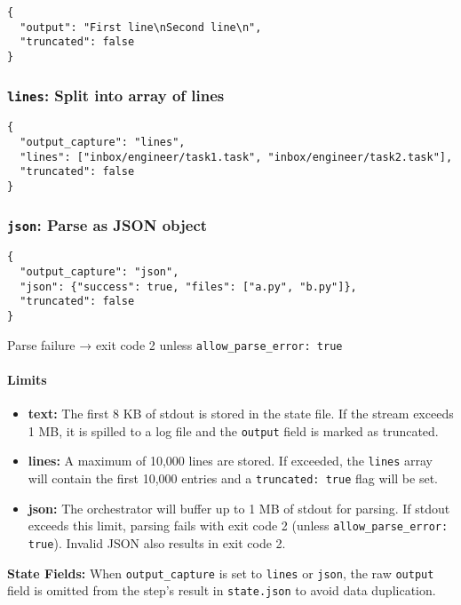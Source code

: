 \documentclass[11pt,a4paper]{article}
\begin{document}
\begin{lstlisting}[caption={Text Output Capture}]
{
  "output": "First line\nSecond line\n",
  "truncated": false
}
\end{lstlisting}

\subsubsection{\texttt{lines}: Split into array of lines}

\begin{lstlisting}[caption={Lines Output Capture}]
{
  "output_capture": "lines",
  "lines": ["inbox/engineer/task1.task", "inbox/engineer/task2.task"],
  "truncated": false
}
\end{lstlisting}

\subsubsection{\texttt{json}: Parse as JSON object}

\begin{lstlisting}[caption={JSON Output Capture}]
{
  "output_capture": "json",
  "json": {"success": true, "files": ["a.py", "b.py"]},
  "truncated": false
}
\end{lstlisting}

Parse failure → exit code 2 unless \texttt{allow\_parse\_error: true}

\paragraph{Limits}
\begin{itemize}
    \item \textbf{text:} The first 8 KB of stdout is stored in the state file. If the stream exceeds 1 MB, it is spilled to a log file and the \texttt{output} field is marked as truncated.
    \item \textbf{lines:} A maximum of 10,000 lines are stored. If exceeded, the \texttt{lines} array will contain the first 10,000 entries and a \texttt{truncated: true} flag will be set.
    \item \textbf{json:} The orchestrator will buffer up to 1 MB of stdout for parsing. If stdout exceeds this limit, parsing fails with exit code 2 (unless \texttt{allow\_parse\_error: true}). Invalid JSON also results in exit code 2.
\end{itemize}

\textbf{State Fields:} When \texttt{output\_capture} is set to \texttt{lines} or \texttt{json}, the raw \texttt{output} field is omitted from the step's result in \texttt{state.json} to avoid data duplication.
\end{document}
